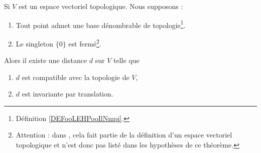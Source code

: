 \begin{theorem}      \label{THOooAGBXooZnvQLK}
	Si \( V\) est un espace vectoriel topologique. Nous supposons :
	\begin{enumerate}
		\item
		      Tout point admet une base dénombrable de topologie\footnote{Définition \ref{DEFooLEHPooIlNmpi}.}.
		\item
		      Le singleton \( \{ 0 \}\) est fermé\footnote{Attention : dans \cite{ooMKWJooLSkGfh}, cela fait partie de la définition d'un espace vectoriel topologique et n'est donc pas listé dans les hypothèses de ce théorème.}.
	\end{enumerate}
	Alors il existe une distance \( d\) sur \( V\) telle que
	\begin{enumerate}
		\item
		      \( d\) est compatible avec la topologie de \( V\),
		\item
		      \( d\) est invariante par translation.
	\end{enumerate}
\end{theorem}

